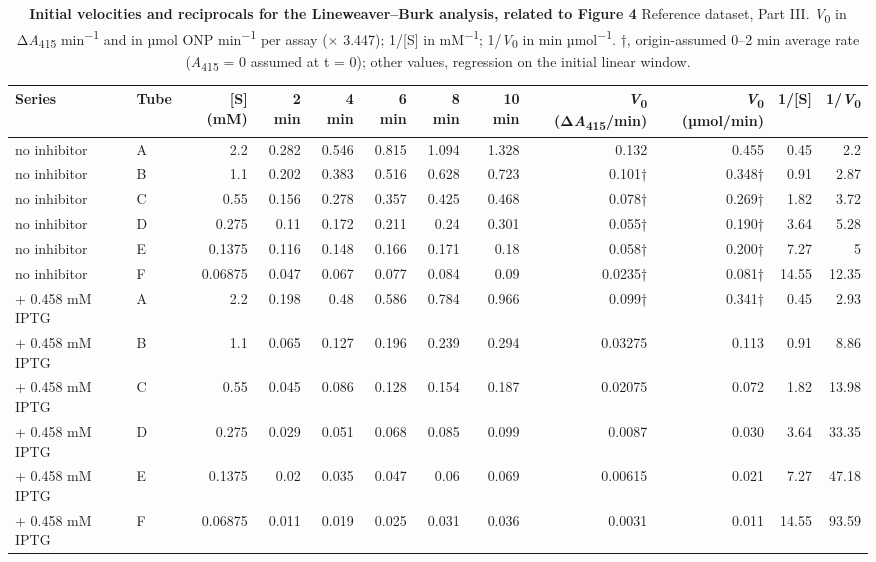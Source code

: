\documentclass[9pt,twocolumn]{extarticle}
\newcommand{\Vo}{\textit{V}\textsubscript{0}}
\newcommand{\Aa}{\textit{A}\textsubscript{415}}
\newcommand{\dAa}{Δ\textit{A}\textsubscript{415}}
\newcommand{\permin}{min\textsuperscript{−1}}
\newcommand{\dash}{–}
\begin{document}
\begin{table}[h]
\caption{\textbf{Initial velocities and reciprocals for the Lineweaver\dash Burk analysis, related to Figure 4}\newline
Reference dataset, Part III. \Vo{} in \dAa{} \permin{} and in µmol ONP \permin{} per assay (× 3.447); 1/[S] in mM\textsuperscript{−1}; 1/\Vo{} in min µmol\textsuperscript{−1}. †, origin-assumed 0\dash 2 min average rate (\Aa{} = 0 assumed at t = 0); other values, regression on the initial linear window.}
\footnotesize
\begin{tabular}{@{}llrrrrrrrrrr@{}}
\toprule
Series & Tube & [S] (mM) & 2 min & 4 min & 6 min & 8 min & 10 min & \Vo{} (\dAa/min) & \Vo{} (µmol/min) & 1/[S] & 1/\Vo \\
\midrule
no inhibitor & A & 2.2 & 0.282 & 0.546 & 0.815 & 1.094 & 1.328 & 0.132 & 0.455 & 0.45 & 2.2 \\
no inhibitor & B & 1.1 & 0.202 & 0.383 & 0.516 & 0.628 & 0.723 & 0.101† & 0.348† & 0.91 & 2.87 \\
no inhibitor & C & 0.55 & 0.156 & 0.278 & 0.357 & 0.425 & 0.468 & 0.078† & 0.269† & 1.82 & 3.72 \\
no inhibitor & D & 0.275 & 0.11 & 0.172 & 0.211 & 0.24 & 0.301 & 0.055† & 0.190† & 3.64 & 5.28 \\
no inhibitor & E & 0.1375 & 0.116 & 0.148 & 0.166 & 0.171 & 0.18 & 0.058† & 0.200† & 7.27 & 5 \\
no inhibitor & F & 0.06875 & 0.047 & 0.067 & 0.077 & 0.084 & 0.09 & 0.0235† & 0.081† & 14.55 & 12.35 \\
+ 0.458 mM IPTG & A & 2.2 & 0.198 & 0.48 & 0.586 & 0.784 & 0.966 & 0.099† & 0.341† & 0.45 & 2.93 \\
+ 0.458 mM IPTG & B & 1.1 & 0.065 & 0.127 & 0.196 & 0.239 & 0.294 & 0.03275 & 0.113 & 0.91 & 8.86 \\
+ 0.458 mM IPTG & C & 0.55 & 0.045 & 0.086 & 0.128 & 0.154 & 0.187 & 0.02075 & 0.072 & 1.82 & 13.98 \\
+ 0.458 mM IPTG & D & 0.275 & 0.029 & 0.051 & 0.068 & 0.085 & 0.099 & 0.0087 & 0.030 & 3.64 & 33.35 \\
+ 0.458 mM IPTG & E & 0.1375 & 0.02 & 0.035 & 0.047 & 0.06 & 0.069 & 0.00615 & 0.021 & 7.27 & 47.18 \\
+ 0.458 mM IPTG & F & 0.06875 & 0.011 & 0.019 & 0.025 & 0.031 & 0.036 & 0.0031 & 0.011 & 14.55 & 93.59 \\
\bottomrule
\end{tabular}
\end{table}
\end{document}
